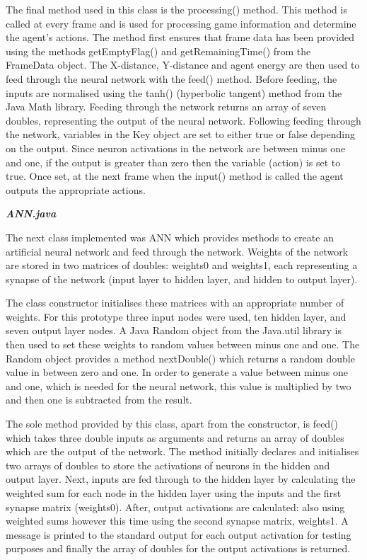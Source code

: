 \documentclass[12pt,a4paper]{article}
\begin{document}
The final method used in this class is the processing() method. This method is called at every frame and is used for processing game information and determine the agent's actions. The method first ensures that frame data has been provided using the methods getEmptyFlag() and getRemainingTime() from the FrameData object. The X-distance, Y-distance and agent energy are then used to feed through the neural network with the feed() method. Before feeding, the inputs are normalised using the tanh() (hyperbolic tangent) method from the Java Math library. Feeding through the network returns an array of seven doubles, representing the output of the neural network. Following feeding through the network, variables in the Key object are set to either true or false depending on the output. Since neuron activations in the network are between minus one and one, if the output is greater than zero then the variable (action) is set to true. Once set, at the next frame when the input() method is called the agent outputs the appropriate actions.

\newpage
\textbf{\textit{ANN.java}}

\vspace{3mm}

The next class implemented was ANN which provides methods to create an artificial neural network and feed through the network. Weights of the network are stored in two matrices of doubles: weights0 and weights1, each representing a synapse of the network (input layer to hidden layer, and hidden to output layer). 

The class constructor initialises these matrices with an appropriate number of weights. For this prototype three input nodes were used, ten hidden layer, and seven output layer nodes. A Java Random object from the Java.util library is then used to set these weights to random values between minus one and one. The Random object provides a method nextDouble() which returns a random double value in between zero and one. In order to generate a value between minus one and one, which is needed for the neural network, this value is multiplied by two and then one is subtracted from the result.

The sole method provided by this class, apart from the constructor, is feed() which takes three double inputs as arguments and returns an array of doubles which are the output of the network. The method initially declares and initialises two arrays of doubles to store the activations of neurons in the hidden and output layer. Next, inputs are fed through to the hidden layer by calculating the weighted sum for each node in the hidden layer using the inputs and the first synapse matrix (weights0). After, output activations are calculated: also using weighted sums however this time using the second synapse matrix, weights1. A message is printed to the standard output for each output activation for testing purposes and finally the array of doubles for the output activations is returned.
\end{document}
